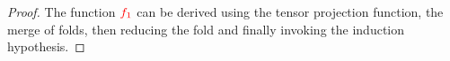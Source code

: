 \begin{proof}
 The function ${\color{red}{f_1}}$ can be derived using the tensor projection function, the merge of folds, then reducing the fold and finally invoking the induction hypothesis. 



\end{proof}
